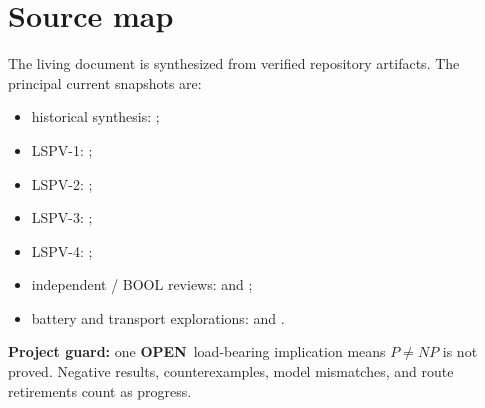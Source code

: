 \documentclass[11pt]{article}
\newcommand{\statusopen}{\textcolor{openstatus}{\textbf{OPEN}}}
\begin{document}
\section{Source map}

The living document is synthesized from verified repository artifacts. The principal current
snapshots are:

\begin{itemize}
  \item historical synthesis:
    ;
  \item LSPV-1:
    ;
  \item LSPV-2:
    ;
  \item LSPV-3:
    ;
  \item LSPV-4:
    ;
  \item independent / BOOL reviews:
     and ;
  \item battery and transport explorations:
     and
    .
\end{itemize}

\vfill
\begin{center}
\small
\textbf{Project guard:} one \statusopen\ load-bearing implication means \(P\neq NP\) is not proved.
Negative results, counterexamples, model mismatches, and route retirements count as progress.
\end{center}
\end{document}
